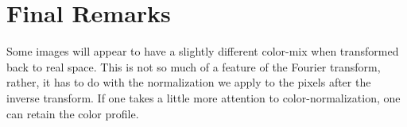 \section{Final Remarks}
Some images will appear to have a slightly different color-mix when transformed back
to real space. This is not so much of a feature of the Fourier transform, rather, it
has to do with the normalization we apply to the pixels after the inverse transform.
If one takes a little more attention to color-normalization, one can retain
the color profile.